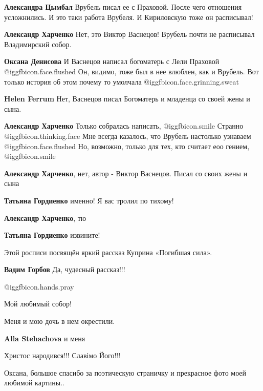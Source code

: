 \begin{itemize}
\begin{itemize}
\textbf{Александра Цымбал} Врубель писал ее с Праховой. После чего отношения усложнились. И это таки работа Врубеля. И Кириловскую тоже он расписывал!

\textbf{Александр Харченко} Нет, это Виктор Васнецов! Врубель почти не расписывал Владимирский собор.

\textbf{Оксана Денисова} И Васнецов написал богоматерь с Лели Праховой  @igg{fbicon.face.flushed} 
Он, видимо, тоже был в нее влюблен, как и Врубель.
Вот только история об этом почему то умолчала  @igg{fbicon.face.grinning.sweat} 

\textbf{Helen Ferrum} Нет, Васнецов писал Богоматерь и младенца со своей жены и сына.

\textbf{Александр Харченко}
Только собралась написать, @igg{fbicon.smile} 
Странно  @igg{fbicon.thinking.face} 
Мне всегда казалось, что Врубель настолько узнаваем  @igg{fbicon.face.flushed} 
Но, возможно, только
для тех, кто считает еоо гением, @igg{fbicon.smile} 

\textbf{Александр Харченко}, нет, автор - Виктор Васнецов. Писал со своих жены и сына

\textbf{Татьяна Гордиенко} именно! Я вас тролил по тихому!

\textbf{Александр Харченко}, тю

\textbf{Татьяна Гордиенко} извините!

\end{itemize} %


Этой росписи посвящён яркий рассказ Куприна «Погибшая сила».

\textbf{Вадим Горбов} Да, чудесный рассказ!!!

 @igg{fbicon.hands.pray} 

Мой любимый собор!

Меня и мою дочь в нем окрестили.

\textbf{Alla Stehachova} и меня

Христос народився!!! Славімо Його!!!

Оксана, большое спасибо за поэтическую страничку и прекрасное фото моей любимой картины..


\end{itemize}
